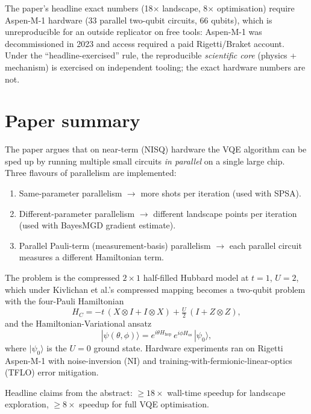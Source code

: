 \documentclass[11pt]{article}
\begin{document}
The paper's headline exact numbers (18$\times$ landscape, 8$\times$ optimisation) require Aspen-M-1 hardware (33 parallel two-qubit circuits, 66 qubits), which is unreproducible for an outside replicator on free tools: Aspen-M-1 was decommissioned in 2023 and access required a paid Rigetti/Braket account. Under the ``headline-exercised'' rule, the reproducible \emph{scientific core} (physics + mechanism) is exercised on independent tooling; the exact hardware numbers are not.

\section{Paper summary}

The paper argues that on near-term (NISQ) hardware the VQE algorithm can be sped up by running multiple small circuits \emph{in parallel} on a single large chip. Three flavours of parallelism are implemented:
\begin{enumerate}
  \item Same-parameter parallelism $\rightarrow$ more shots per iteration (used with SPSA).
  \item Different-parameter parallelism $\rightarrow$ different landscape points per iteration (used with BayesMGD gradient estimate).
  \item Parallel Pauli-term (measurement-basis) parallelism $\rightarrow$ each parallel circuit measures a different Hamiltonian term.
\end{enumerate}

The problem is the compressed $2 \times 1$ half-filled Hubbard model at $t=1$, $U=2$, which under Kivlichan et al.'s compressed mapping becomes a two-qubit problem with the four-Pauli Hamiltonian
\begin{equation}
H_C = -t\,(X \otimes I + I \otimes X) + \tfrac{U}{2}\,(I + Z \otimes Z),
\end{equation}
and the Hamiltonian-Variational ansatz
\begin{equation}
|\psi(\theta,\phi)\rangle = e^{i\theta H_{\mathrm{hop}}}\, e^{i\phi H_{\mathrm{os}}}\, |\psi_0\rangle,
\end{equation}
where $|\psi_0\rangle$ is the $U=0$ ground state. Hardware experiments ran on Rigetti Aspen-M-1 with noise-inversion (NI) and training-with-fermionic-linear-optics (TFLO) error mitigation.

Headline claims from the abstract: $\geq 18\times$ wall-time speedup for landscape exploration, $\geq 8\times$ speedup for full VQE optimisation.
\end{document}
